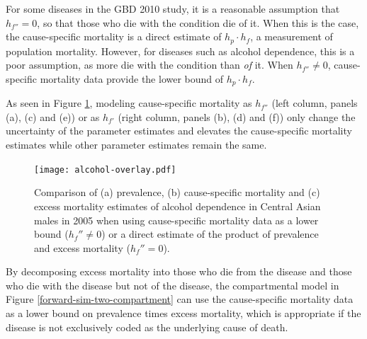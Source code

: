 For some diseases in the GBD 2010 study, it is a reasonable assumption that
$h_{f''} = 0$, so that those who die with the condition die of it.
When this is the case, the cause-specific mortality is a direct
estimate of $h_{p} \cdot h_{f}$, a measurement of population mortality.  
However, for diseases such as alcohol
dependence, this is a poor assumption, as more die with the condition
than \emph{of} it.  When $h_{f''} \neq 0$, cause-specific mortality
data provide the lower bound of $h_{p} \cdot h_{f}$.

As seen in Figure \ref{fig:app-alcohol compare}, modeling cause-specific mortality as
$h_{f''}$ (left column, panels (a), (c) and (e)) or as $h_{f'}$ (right
column, panels (b), (d) and (f)) only change the uncertainty of the
parameter estimates and elevates the cause-specific mortality
estimates while other parameter estimates remain the same.

    \begin{figure}[h]
        \begin{center}
            \texttt{[image: alcohol-overlay.pdf]}
            \caption{Comparison of (a) prevalence,
              (b) cause-specific mortality and (c) excess
              mortality estimates of alcohol
              dependence in Central Asian males in 2005 when using
              cause-specific mortality data as a lower bound ($h_f'' \neq 0$)
              or a direct estimate of the product of
              prevalence and excess mortality ($h_f'' = 0$).}
            \label{fig:app-alcohol compare}
        \end{center}
    \end{figure}

By decomposing excess mortality into those who die from the
disease and those who die with the disease but not of the disease, the
compartmental model in Figure \ref{forward-sim-two-compartment} can
use the cause-specific mortality data as a lower bound on prevalence
times excess mortality, which is appropriate if the
disease is not exclusively coded as the underlying cause of death.
